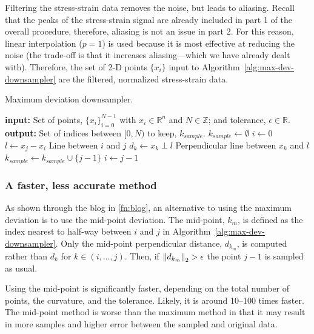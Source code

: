 \documentclass[a4paper,11pt]{article}
\begin{document}
Filtering the stress-strain data removes the noise, but leads to aliasing.
Recall that the peaks of the stress-strain signal are already included in part 1 of the overall procedure, therefore, aliasing is not an issue in part 2.
For this reason, linear interpolation ($p = 1$) is used because it is most effective at reducing the noise (the trade-off is that it increases aliasing---which we have already dealt with).
Therefore, the set of 2-D points $\{x_i\}$ input to Algorithm~\ref{alg:max-dev-downsampler} are the filtered, normalized stress-strain data.

\begin{algorithm}
	\caption{Maximum deviation downsampler.}
	\label{alg:max-dev-downsampler}
	\begin{algorithmic}[1]
		\State \textbf{input:} Set of points, $\{x_i\}_{i=0}^{N-1}$ with $x_i \in \mathbb{R}^n$ and $N \in \mathbb{Z}$; and tolerance, $\epsilon \in \mathbb{R}$.
        \State \textbf{output:} Set of indices between $[0, N)$ to keep, $k_{sample}$.
        \State $k_{sample} \gets \emptyset$
        \State $i \gets 0$
			\State $l \gets x_j - x_i$
            \Comment Line between $i$ and $j$
                \State $d_k \gets x_k \perp l$
                \Comment Perpendicular line between $x_k$ and $l$
            \EndFor
                \State $k_{sample} \gets k_{sample} \cup \{j - 1 \}$
                \State $i \gets j - 1$
            \EndIf
		\EndFor
\end{algorithmic}
\end{algorithm}

\subsubsection{A faster, less accurate method}

As shown through the blog in \cref{fn:blog}, an alternative to using the maximum deviation is to use the mid-point deviation.
The mid-point, $k_m$, is defined as the index nearest to half-way between $i$ and $j$ in Algorithm~\ref{alg:max-dev-downsampler}.
Only the mid-point perpendicular distance, $d_{k_m}$, is computed rather than $d_k$ for $k \in (i, \ldots, j)$.
Then, if $\norm{d_{k_m}}_2 > \epsilon$ the point $j - 1$ is sampled as usual.

Using the mid-point is significantly faster, depending on the total number of points, the curvature, and the tolerance.
Likely, it is around 10--100 times faster.
The mid-point method is worse than the maximum method in that it may result in more samples and higher error between the sampled and original data.
\end{document}
